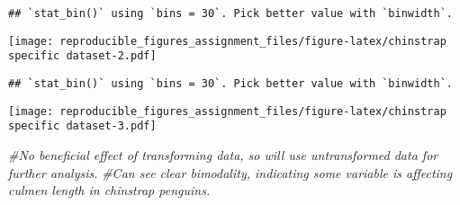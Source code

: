 \documentclass[
]{article}
\newenvironment{Shaded}{\begin{snugshade}}{\end{snugshade}}
\newcommand{\AttributeTok}[1]{\textcolor[rgb]{0.13,0.29,0.53}{#1}}
\newcommand{\CommentTok}[1]{\textcolor[rgb]{0.56,0.35,0.01}{\textit{#1}}}
\newcommand{\FunctionTok}[1]{\textcolor[rgb]{0.13,0.29,0.53}{\textbf{#1}}}
\newcommand{\NormalTok}[1]{#1}
\newcommand{\OtherTok}[1]{\textcolor[rgb]{0.56,0.35,0.01}{#1}}
\newcommand{\SpecialCharTok}[1]{\textcolor[rgb]{0.81,0.36,0.00}{\textbf{#1}}}
\begin{document}
\begin{verbatim}
## `stat_bin()` using `bins = 30`. Pick better value with `binwidth`.
\end{verbatim}

\texttt{[image: reproducible\_figures\_assignment\_files/figure-latex/chinstrap specific dataset-2.pdf]}

\begin{Shaded}
\end{Shaded}

\begin{verbatim}
## `stat_bin()` using `bins = 30`. Pick better value with `binwidth`.
\end{verbatim}

\texttt{[image: reproducible\_figures\_assignment\_files/figure-latex/chinstrap specific dataset-3.pdf]}

\begin{Shaded}
\begin{Highlighting}[]
\CommentTok{\#No beneficial effect of transforming data, so will use untransformed data for further analysis.}
\CommentTok{\#Can see clear bimodality, indicating some variable is affecting culmen length in chinstrap penguins.}
\end{Highlighting}
\end{Shaded}
\end{document}
